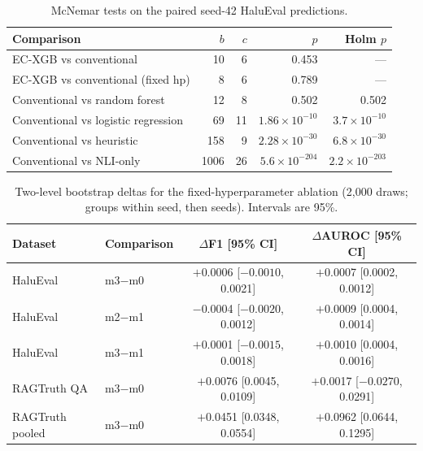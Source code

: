\documentclass[a4paper,fleqn]{cas-sc}
\begin{document}
\begin{table}[pos=htbp]
  \centering
  \caption{McNemar tests on the paired seed-42 HaluEval predictions.}
  \label{tab:mcnemar}
  \begin{tabular}{lrrrr}
    \toprule
    \textbf{Comparison} & \textbf{$b$} & \textbf{$c$} & \textbf{$p$} & \textbf{Holm $p$} \\
    \midrule
    EC-XGB vs conventional          & 10   & 6  & 0.453            & ---              \\
    EC-XGB vs conventional (fixed hp) & 8  & 6  & 0.789            & ---              \\
    Conventional vs random forest   & 12   & 8  & 0.502            & 0.502            \\
    Conventional vs logistic regression & 69 & 11 & $1.86\times10^{-10}$ & $3.7\times10^{-10}$ \\
    Conventional vs heuristic       & 158  & 9  & $2.28\times10^{-30}$ & $6.8\times10^{-30}$ \\
    Conventional vs NLI-only        & 1006 & 26 & $5.6\times10^{-204}$ & $2.2\times10^{-203}$ \\
    \bottomrule
  \end{tabular}
\end{table}



\begin{table}[pos=htbp]
  \centering
  \caption{Two-level bootstrap deltas for the fixed-hyperparameter ablation (2{,}000 draws; groups within seed, then seeds). Intervals are 95\%.}
  \label{tab:stats}
  \setlength{\tabcolsep}{4pt}
  \begin{tabular}{llcc}
    \toprule
    \textbf{Dataset} & \textbf{Comparison} & \textbf{$\Delta$F1 [95\% CI]} & \textbf{$\Delta$AUROC [95\% CI]} \\
    \midrule
    HaluEval          & m3$-$m0 & $+$0.0006 [$-0.0010$, 0.0021] & $+$0.0007 [0.0002, 0.0012] \\
    HaluEval          & m2$-$m1 & $-$0.0004 [$-0.0020$, 0.0012] & $+$0.0009 [0.0004, 0.0014] \\
    HaluEval          & m3$-$m1 & $+$0.0001 [$-0.0015$, 0.0018] & $+$0.0010 [0.0004, 0.0016] \\
    RAGTruth QA       & m3$-$m0 & $+$0.0076 [0.0045, 0.0109] & $+$0.0017 [$-0.0270$, 0.0291] \\
    RAGTruth pooled   & m3$-$m0 & $+$0.0451 [0.0348, 0.0554] & $+$0.0962 [0.0644, 0.1295] \\
    \bottomrule
  \end{tabular}
\end{table}
\end{document}
